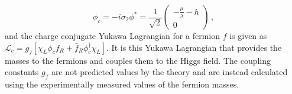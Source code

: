 \begin{equation}
	\phi_c=-i\sigma_2\phi^*=\frac{1}{\sqrt{2}}\begin{pmatrix}-\frac{\mu}{\lambda}-h\\0\end{pmatrix}\,,
\end{equation}
and the charge conjugate Yukawa Lagrangian for a fermion $f$ is given as $\mathcal{L}_c=g_f[\chi_L\phi_cf_R+\bar{f}_R\phi_c^\dagger\chi_L]$. It is this Yukawa Lagrangian that provides the masses to the fermions and couples them to the Higgs field. The coupling constants $g_f$ are not predicted values by the theory and are instead calculated using the experimentally measured values of the fermion masses.
